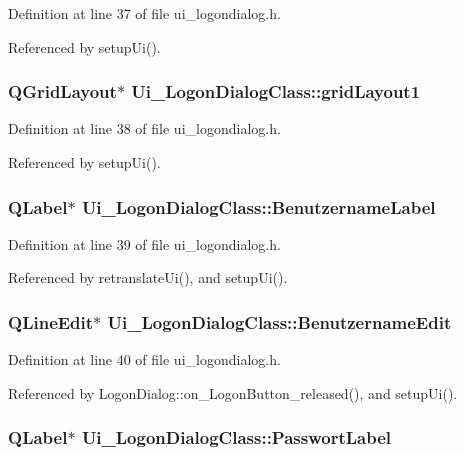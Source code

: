 Definition at line 37 of file ui\_\-logondialog.h.

Referenced by setupUi().\hypertarget{class_ui___logon_dialog_class_fce32135738822d47d0f65ddfe08f787}{
\subsubsection[gridLayout1]{\setlength{\rightskip}{0pt plus 5cm}QGridLayout$\ast$ {\bf Ui\_\-LogonDialogClass::gridLayout1}}}
\label{class_ui___logon_dialog_class_fce32135738822d47d0f65ddfe08f787}




Definition at line 38 of file ui\_\-logondialog.h.

Referenced by setupUi().\hypertarget{class_ui___logon_dialog_class_e14889d7536d1fb187db6ed2611c70b1}{
\subsubsection[BenutzernameLabel]{\setlength{\rightskip}{0pt plus 5cm}QLabel$\ast$ {\bf Ui\_\-LogonDialogClass::BenutzernameLabel}}}
\label{class_ui___logon_dialog_class_e14889d7536d1fb187db6ed2611c70b1}




Definition at line 39 of file ui\_\-logondialog.h.

Referenced by retranslateUi(), and setupUi().\hypertarget{class_ui___logon_dialog_class_c88010fa89bfdf2e7c7eb6e260d2ded1}{
\subsubsection[BenutzernameEdit]{\setlength{\rightskip}{0pt plus 5cm}QLineEdit$\ast$ {\bf Ui\_\-LogonDialogClass::BenutzernameEdit}}}
\label{class_ui___logon_dialog_class_c88010fa89bfdf2e7c7eb6e260d2ded1}




Definition at line 40 of file ui\_\-logondialog.h.

Referenced by LogonDialog::on\_\-LogonButton\_\-released(), and setupUi().\hypertarget{class_ui___logon_dialog_class_a216bf5d0e32754d5448283f98ec466a}{
\subsubsection[PasswortLabel]{\setlength{\rightskip}{0pt plus 5cm}QLabel$\ast$ {\bf Ui\_\-LogonDialogClass::PasswortLabel}}}
\label{class_ui___logon_dialog_class_a216bf5d0e32754d5448283f98ec466a}




